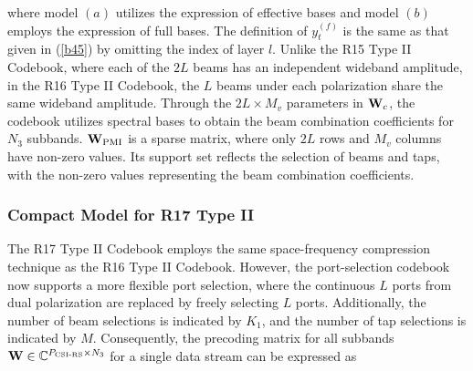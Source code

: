 \documentclass[lettersize,journal]{IEEEtran}
\begin{document}
where model $(a)$ utilizes the expression of effective bases and model $(b)$ employs the expression of full bases. The definition of ${y_t^{(f)}}$ is the same as that given in (\ref{b45}) by omitting the index of layer $l$. Unlike the R15 Type II Codebook, where each of the $2L$ beams has an independent wideband amplitude, in the R16 Type II Codebook, the $L$ beams under each polarization share the same wideband amplitude. Through the $2L \times M_v$ parameters in ${{{\bf{W}}_c}}$, the codebook utilizes spectral bases to obtain the beam combination coefficients for $N_3$ subbands. ${\bf{W}}_{\rm{PMI}}$ is a sparse matrix, where only $2L$ rows and $M_v$ columns have non-zero values. Its support set reflects the selection of beams and taps, with the non-zero values representing the beam combination coefficients.

\subsubsection{Compact Model for R17 Type II}
The R17 Type II Codebook employs the same space-frequency compression technique as the R16 Type II Codebook. However, the port-selection codebook now supports a more flexible port selection, where the continuous $L$ ports from dual polarization are replaced by freely selecting $L$ ports. Additionally, the number of beam selections is indicated by $K_1$, and the number of tap selections is indicated by $M$.  Consequently, the precoding matrix for all subbands \( {\bf{W}} \in \mathbb{C}^{{P_{{\text{CSI-RS}}}}\times N_3} \) for a single data stream can be expressed as
\end{document}
